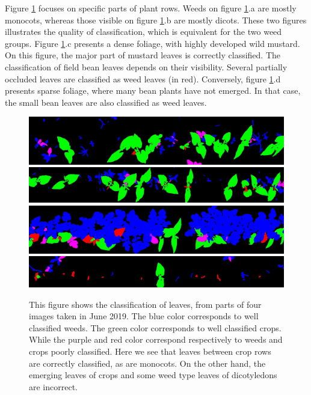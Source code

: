 \documentclass[../thesis.tex]{subfiles}
\begin{document}
    Figure \ref{fig:render-rose-2} focuses on specific parts of plant rows. Weeds on figure \ref{fig:render-rose-2}.a are mostly monocots, whereas those visible on figure \ref{fig:render-rose-2}.b are mostly dicots. These two figures illustrates the quality of classification, which is equivalent for the two weed groups. Figure \ref{fig:render-rose-2}.c presents a dense foliage, with highly developed wild mustard. On this figure, the major part of mustard leaves is correctly classified. The classification of field bean leaves depends on their visibility. Several partially occluded leaves are classified as weed leaves (in red). Conversely, figure \ref{fig:render-rose-2}.d presents sparse foliage, where many bean plants have not emerged. In that case, the small bean leaves are also classified as weed leaves.   
    
    \begin{figure}[H]
        \centering 
        \includegraphics[width=\linewidth]{img/features/rose2-2.jpg} \\ \vspace{1em}
        \includegraphics[width=\linewidth]{img/features/rose2-3.jpg} \\ \vspace{1em}
        \includegraphics[width=\linewidth]{img/features/rose2-8.jpg} \\ \vspace{1em}
        \includegraphics[width=\linewidth]{img/features/rose2-11.jpg} \\
        \caption{This figure shows the classification of leaves, from parts of four images taken in June 2019. The blue color corresponds to well classified weeds. The green color corresponds to well classified crops. While the purple and red color correspond respectively to weeds and crops poorly classified. Here we see that leaves between crop rows are correctly classified, as are monocots. On the other hand, the emerging leaves of crops and some weed type leaves of dicotyledons are incorrect.}
        \label{fig:render-rose-2}
    \end{figure}
    
\end{document}
